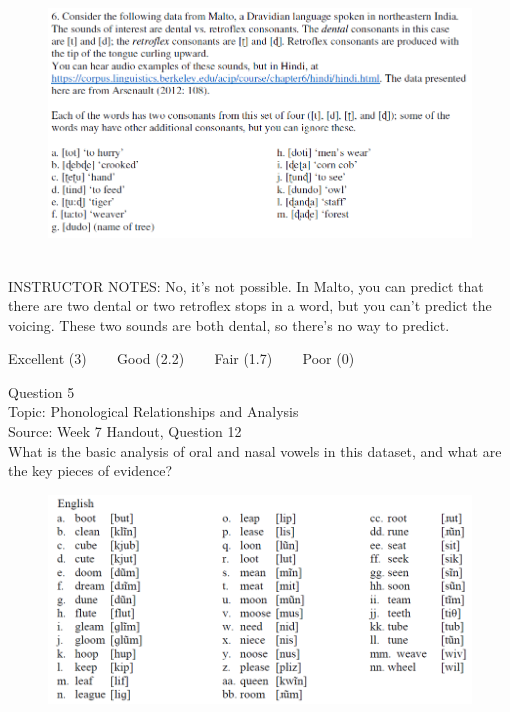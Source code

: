 \documentclass[12pt]{article}
\begin{document}
\begin{figure}[H]
\includegraphics{../images/malto.png}
\end{figure}

~\\
INSTRUCTOR NOTES: No, it's not possible. In Malto, you can predict that there are two dental or two retroflex stops in a word, but you can't predict the voicing. These two sounds are both dental, so there's no way to predict.


\vfill
Excellent (3) ~~~ Good (2.2) ~~~ Fair (1.7) ~~~ Poor (0)
\newpage

{\large Question 5}\\

Topic: Phonological Relationships and Analysis\\
Source: Week 7 Handout, Question 12\\

What is the basic analysis of oral and nasal vowels in this dataset, and what are the key pieces of evidence?\\

\begin{figure}[H]
\includegraphics{../images/english12.png}
\end{figure}
\end{document}
